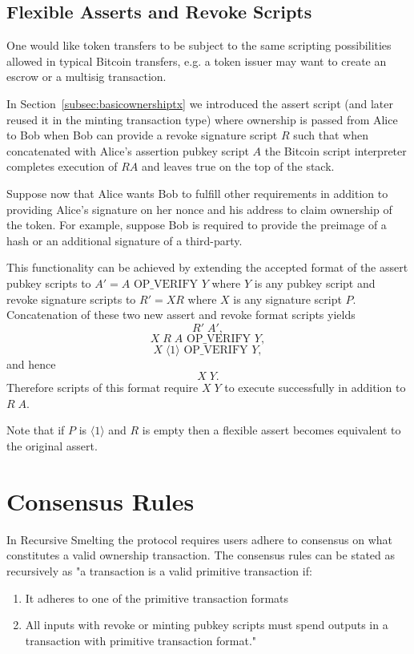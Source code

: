 \documentclass[9pt,oneside]{amsart}
\begin{document}
\subsection{Flexible Asserts and Revoke Scripts}\label{subsec:flexassertrevoke}
One would like token transfers to be subject to the same scripting possibilities allowed in typical Bitcoin transfers, e.g. a token issuer may want to create an escrow or a multisig transaction.

In Section~\ref{subsec:basicownershiptx} we introduced the assert script (and later reused it in the minting transaction type) where ownership is passed from Alice to Bob when Bob can provide a revoke signature script $R$ such that when concatenated with Alice's assertion pubkey script $A$ the Bitcoin script interpreter completes execution of $RA$ and leaves true on the top of the stack. 

Suppose now that Alice wants Bob to fulfill other requirements in addition to providing Alice's signature on her nonce and his address to claim ownership of the token. For example, suppose Bob is required to provide the preimage of a hash or an additional signature of a third-party. 

This functionality can be achieved by extending the accepted format of the assert pubkey scripts to $A' = A \text{ OP\_VERIFY } Y$ where $Y$ is any pubkey script and revoke signature scripts to $R' = X R$ where $X$ is any signature script $P$. Concatenation of these two new assert and revoke format scripts yields
\[R' \; A',\]
\[X \; R \; A \text{ OP\_VERIFY } Y,\]
\[X \; \langle 1 \rangle \text{ OP\_VERIFY } Y,\]
and hence
\[X \; Y.\]
Therefore scripts of this format require $X \; Y$ to execute successfully in addition to $R \; A$. 

Note that if $P$ is $\langle 1 \rangle$ and $R$ is empty then a flexible assert becomes equivalent to the original assert.


\section{Consensus Rules}
In Recursive Smelting the protocol requires users adhere to consensus on what constitutes a valid ownership transaction. The consensus rules can be stated as recursively as "a  transaction is a valid primitive transaction if:
    \begin{enumerate}
        \item It adheres to one of the primitive transaction formats 
        \item All inputs with revoke or minting pubkey scripts must  spend outputs in a transaction with primitive transaction format."
    \end{enumerate}
    
\end{document}
